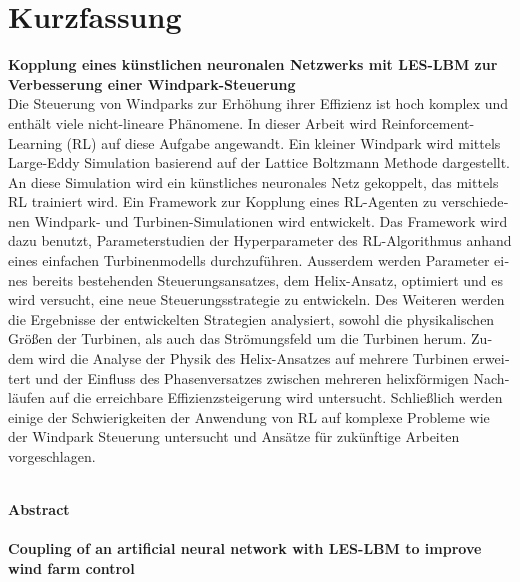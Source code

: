 \chapter*{Kurzfassung}
\thispagestyle{empty}
\begin{otherlanguage}{german}
\textbf{\large Kopplung eines künstlichen neuronalen Netzwerks mit LES-LBM zur Verbesserung einer Windpark-Steuerung}\\
Die Steuerung von Windparks zur Erhöhung ihrer Effizienz ist hoch komplex und enthält viele nicht-lineare Phänomene. In dieser Arbeit wird Reinforcement-Learning (RL) auf diese Aufgabe angewandt. Ein kleiner Windpark wird mittels Large-Eddy Simulation basierend auf der Lattice Boltzmann Methode dargestellt. An diese Simulation wird ein künstliches neuronales Netz gekoppelt, das mittels RL trainiert wird. Ein Framework zur Kopplung eines RL-Agenten zu verschiedenen Windpark- und Turbinen-Simulationen wird entwickelt. Das Framework wird dazu benutzt, Parameterstudien der Hyperparameter des RL-Algorithmus anhand eines einfachen Turbinenmodells durchzuführen. Ausserdem werden Parameter eines bereits bestehenden Steuerungsansatzes, dem Helix-Ansatz, optimiert und es wird versucht, eine neue Steuerungsstrategie zu entwickeln. Des Weiteren werden die Ergebnisse der entwickelten Strategien analysiert, sowohl die physikalischen Größen der Turbinen, als auch das Strömungsfeld um die Turbinen herum. Zudem wird die Analyse der Physik des Helix-Ansatzes auf mehrere Turbinen erweitert und der Einfluss des Phasenversatzes zwischen mehreren helixförmigen Nachläufen auf die erreichbare Effizienzsteigerung wird untersucht. Schließlich werden einige der Schwierigkeiten der Anwendung von RL auf komplexe Probleme wie der Windpark Steuerung untersucht und Ansätze für zukünftige Arbeiten vorgeschlagen.
\end{otherlanguage}
\vspace{2cm} \\
{\bfseries \sffamily \huge Abstract} \\
\vspace{1cm} \\
\textbf{\large Coupling of an artificial neural network with LES-LBM to improve wind farm control}\\
